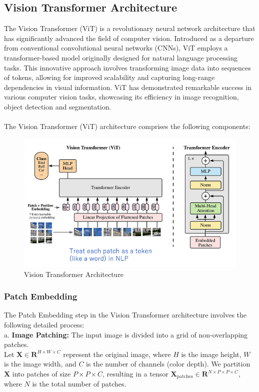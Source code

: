 \subsection{Vision Transformer Architecture}

The Vision Transformer (ViT) is a revolutionary neural network architecture that has significantly advanced the field of computer vision. Introduced as a departure from conventional convolutional neural networks (CNNs), ViT employs a transformer-based model originally designed for natural language processing tasks. This innovative approach involves transforming image data into sequences of tokens, allowing for improved scalability and capturing long-range dependencies in visual information. ViT has demonstrated remarkable success in various computer vision tasks, showcasing its efficiency in image recognition, object detection and segmentation.
\\\\
The Vision Transformer (ViT) architecture comprises the following components:

\begin{figure}[htbp]
    \centering
    \includegraphics[width=6in]{img/visiontransformer.png}
    \caption{{Vision Transformer Architecture}}
\end{figure}

\item
\subsubsection{Patch Embedding}
The Patch Embedding step in the Vision Transformer architecture involves the following detailed process:
\\

\noindent a. \textbf{Image Patching:} The input image is divided into a grid of non-overlapping patches.\\
Let $\mathbf{X} \in \mathbf{R}^{H \times W \times C}$ represent the original image, where $H$ is the image height, $W$ is the image width, and $C$ is the number of channels (color depth). We partition $\mathbf{X}$ into patches of size $P \times P \times C$, resulting in a tensor $\mathbf{X}_\text{patches} \in \mathbf{R}^{N \times P \times P \times C}$, where $N$ is the total number of patches.
\\

